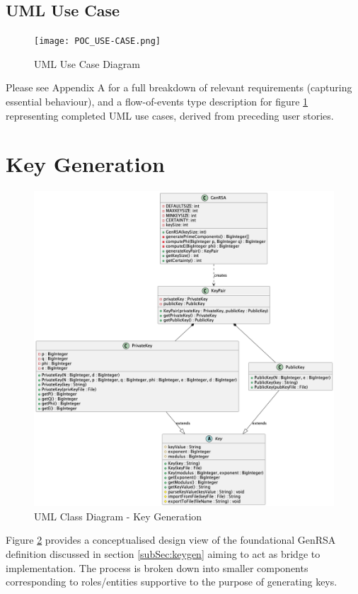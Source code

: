 \documentclass[]{final_report}
\theoremstyle{definition}
\begin{document}
\subsection{UML Use Case}
\begin{figure}[H]
    \centering
    \texttt{[image: POC\_USE-CASE.png]}
    \caption{UML Use Case Diagram}
    \label{fig:uc}
\end{figure}

Please see Appendix A for a full breakdown of relevant requirements (capturing essential behaviour), and a flow-of-events type description for figure \ref{fig:uc} representing completed UML use cases, derived from preceding user stories.

\section{Key Generation}
\begin{figure}[H]
    \centering
    \includegraphics[scale=0.48]{KeyGeneration.png}
    \caption{UML Class Diagram - Key Generation}
    \label{fig:kg}
\end{figure}

Figure \ref{fig:kg} provides a conceptualised design view of the foundational GenRSA definition discussed in section  \ref{subSec:keygen} aiming to act as bridge to implementation. The process is broken down into smaller components corresponding to roles/entities supportive to the purpose of generating keys. 
\end{document}
